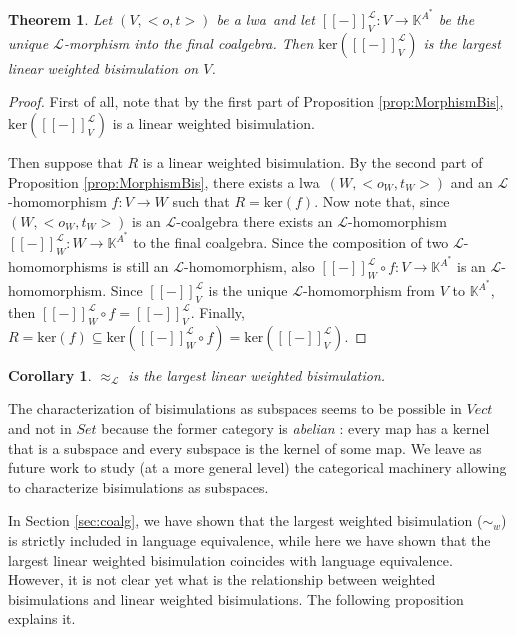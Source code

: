 \documentclass[3p]{elsarticle}
\newcommand{\fL}{\mathcal{L}}    %
\newcommand{\beh}[3]{\left[\!\left[ #1 \right]\!\right]^{#2}_{#3}} %
\newcommand{\comp}{\circ}               %
\newcommand{\K}{\mathbb{K}}            %
\newcommand{\kernel}{\mathrm{ker}} %
\newcommand{\lwa}{{\sc lwa}}           %
\newtheorem{theorem}{Theorem}
\newtheorem{corollary}{Corollary}
\begin{document}
\begin{theorem}
Let $(V,<o,t>)$ be a \lwa\ and let $\beh{-}{\fL}{V}\colon V \to
\K^{A^*}$ be the unique $\fL$-morphism into the final coalgebra.
Then $\kernel(\beh{-}{\fL}{V})$ is the largest linear weighted
bisimulation on $V$.
\end{theorem}
\begin{proof}
First of all, note that by the first part of Proposition
\ref{prop:MorphismBis}, $\kernel(\beh{-}{\fL}{V})$ is a linear
weighted bisimulation.

Then suppose that $R$ is a linear weighted bisimulation. By the
second part of Proposition \ref{prop:MorphismBis}, there exists a
\lwa\ $(W,<o_W,t_W>)$ and an $\fL$-homomorphism $f\colon V\to W$
such that $R=\kernel(f)$. Now note that, since $(W,<o_W,t_W>)$ is an
$\fL$-coalgebra there exists an $\fL$-homomorphism
$\beh{-}{\fL}{W}\colon W \to \K^{A^*}$ to the final coalgebra. Since
the composition of two $\fL$-homomorphisms is still an
$\fL$-homomorphism, also $\beh{-}{\fL}{W} \comp f\colon V \to
\K^{A^*}$ is an $\fL$-homomorphism. Since $\beh{-}{\fL}{V}$ is the
unique $\fL$-homomorphism from $V$ to $\K^{A^*}$, then
$\beh{-}{\fL}{W} \comp f=\beh{-}{\fL}{V}$. Finally,
$R=\kernel(f)\subseteq \kernel(\beh{-}{\fL}{W} \comp f) =
\kernel(\beh{-}{\fL}{V})$.
\end{proof}
\begin{corollary}\label{corollary}
$\approx_{\fL}$ is the largest linear weighted bisimulation.
\end{corollary}

The characterization of bisimulations as subspaces seems to be
possible in $Vect$ and not in $Set$ because the former category is
\emph{abelian} \cite{Abelian}: every map has a kernel that is a
subspace and every subspace is the kernel of some map. We leave as
future work to study (at a more general level) the categorical
machinery allowing to characterize bisimulations as subspaces.

\smallskip

In Section \ref{sec:coalg}, we have shown that the largest weighted bisimulation ($\sim_w$) is strictly included in language equivalence,
while here we have shown that the largest linear weighted bisimulation coincides with language equivalence.
However, it is not clear yet what is the relationship between weighted bisimulations and linear weighted bisimulations.
The following proposition explains it.
\end{document}
